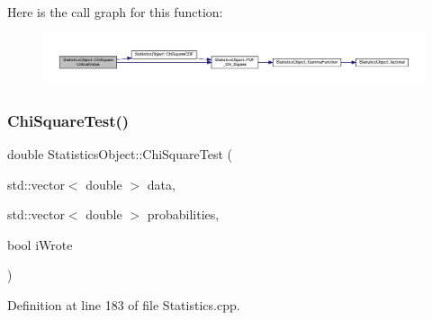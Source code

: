 Here is the call graph for this function\+:\nopagebreak
\begin{figure}[H]
\begin{center}
\leavevmode
\includegraphics[width=350pt]{class_statistics_object_aa4d91e7d45164eb8a3849c1c7df585e1_cgraph}
\end{center}
\end{figure}
\mbox{\label{class_statistics_object_a5f516a6f544714694efc0ba0f925f38c}} 
\subsubsection{\texorpdfstring{Chi\+Square\+Test()}{ChiSquareTest()}\hspace{0.1cm}{\footnotesize\ttfamily [1/2]}}
{\footnotesize\ttfamily double Statistics\+Object\+::\+Chi\+Square\+Test (\begin{DoxyParamCaption}\item[{std\+::vector$<$ double $>$}]{data,  }\item[{std\+::vector$<$ double $>$}]{probabilities,  }\item[{bool}]{i\+Wrote }\end{DoxyParamCaption})}



Definition at line 183 of file Statistics.\+cpp.

